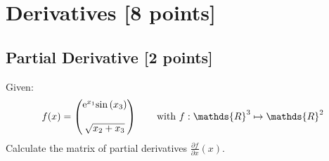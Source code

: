 %

\renewcommand\thesection{\arabic{section}}
\renewcommand\thesubsection{\thesection.\arabic{subsection}}

\section{Derivatives [8 points]}
\subsection{Partial Derivative [2 points]}
    Given:
    \begin{equation}
        f(x) =
        \begin{pmatrix}
            {\rm e}^{x_1} {\rm sin}\left(x_3\right)
            \\\\
            \sqrt{x_2 + x_3}
        \end{pmatrix} \qquad \text{with } f: \mathds{R}^3 \mapsto \mathds{R}^2
    \end{equation}
    Calculate the matrix of partial derivatives $\frac{\partial f}{\partial x}(x)$.
    
    \bymode{}{\vspace{0.5cm}}{}
    
\taskbreak

